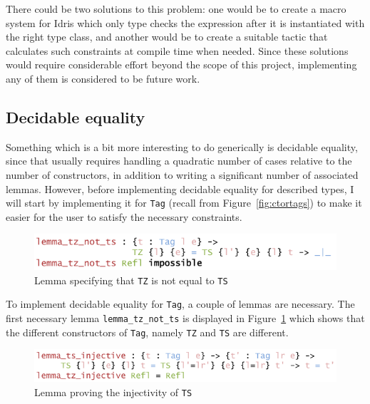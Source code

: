 \documentclass{ituthesis}
\newcommand{\ttconstructor}[1]{\textcolor{constructor-color}{\texttt{#1}}}
\newcommand{\tttype}[1]{\textcolor{type-color}{\texttt{#1}}}
\newcommand{\ttdec}[1]{\textcolor{declared-var-color}{\texttt{#1}}}
\theoremstyle{break}
\begin{document}
There could be two solutions to this problem: one would be to create a macro system for Idris which only type checks the expression after it is instantiated with the right type class, and another
would be to create a suitable tactic that calculates such constraints at compile time when needed.
Since these solutions would require considerable effort beyond the scope of this project, implementing any of them is considered to be future work.


\subsection{Decidable equality}
\label{sub:Decidable equality}
Something which is a bit more interesting to do generically is decidable equality, since that usually
requires handling a quadratic number of cases relative to the number of constructors, in addition to writing a significant number of associated lemmas.
However, before implementing decidable equality for described types, I will start by implementing it for \tttype{Tag} (recall from Figure~\ref{fig:ctortags}) to make it easier for the user to satisfy
the necessary constraints.

\begin{figure}[ht]
\begin{center}
    \includegraphics[scale=0.5]{Figures/TagDecEqLemma1.png}
\end{center}
\caption{Lemma specifying that \ttconstructor{TZ} is not equal to \ttconstructor{TS}}
\label{fig:taglem1}
\end{figure}

To implement decidable equality for \tttype{Tag}, a couple of lemmas are necessary.
The first necessary lemma \ttdec{lemma\_tz\_not\_ts} is displayed in Figure~\ref{fig:taglem1} which shows that the different constructors of \tttype{Tag}, namely \ttconstructor{TZ} and \ttconstructor{TS} are different.

\begin{figure}[ht]
\begin{center}
    \includegraphics[scale=0.5]{Figures/TagDecEqLemma2.png}
\end{center}
\caption{Lemma proving the injectivity of \ttconstructor{TS}}
\label{fig:taglem2}
\end{figure}
\end{document}
